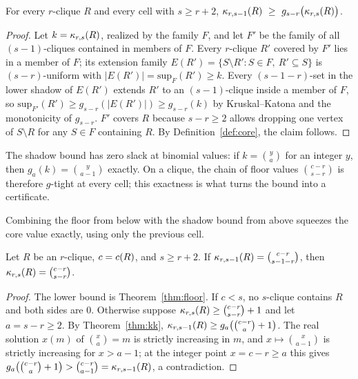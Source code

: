 \begin{theorem}
\label{thm:kk}
For every $r$-clique $R$ and every cell with $s\ge r+2$,
$\corev{r,s-1}(R)\ \ge\ g_{s-r}\big(\corev{r,s}(R)\big)$.
\end{theorem}
\begin{proof}
Let $k=\kappa_{r,s}(R)$, realized by the family $F$, and let $F'$ be the family of all $(s{-}1)$-cliques contained in members of $F$.
%
Every $r$-clique $R'$ covered by $F'$ lies in a member of $F$; its extension family $E(R')=\{S\setminus R' : S\in F,\ R'\subseteq S\}$ is $(s{-}r)$-uniform with $|E(R')|=\mathrm{sup}_F(R')\ge k$.
%
Every $(s{-}1{-}r)$-set in the lower shadow of $E(R')$ extends $R'$ to an $(s{-}1)$-clique inside a member of $F$, so $\mathrm{sup}_{F'}(R')\ge g_{s-r}(|E(R')|)\ge g_{s-r}(k)$ by Kruskal--Katona and the monotonicity of $g_{s-r}$.
%
$F'$ covers $R$ because $s-r\ge 2$ allows dropping one vertex of $S\setminus R$ for any $S\in F$ containing $R$.
%
By Definition~\ref{def:core}, the claim follows.
\end{proof}

\begin{remark}
The shadow bound has zero slack at binomial values: if $k=\binom{y}{a}$ for an integer $y$, then $g_a(k)=\binom{y}{a-1}$ exactly.
%
On a clique, the chain of floor values $\binom{c-r}{s-r}$ is therefore $g$-tight at every cell; this exactness is what turns the bound into a certificate.
\end{remark}

Combining the floor from below with the shadow bound from above squeezes the core value exactly, using only the previous cell.

\begin{theorem}
\label{thm:chain}
Let $R$ be an $r$-clique, $c=c(R)$, and $s\ge r+2$.
%
If $\kappa_{r,s-1}(R)=\binom{c-r}{s-1-r}$, then $\kappa_{r,s}(R)=\binom{c-r}{s-r}$.
\end{theorem}
\begin{proof}
The lower bound is Theorem~\ref{thm:floor}.
%
If $c<s$, no $s$-clique contains $R$ and both sides are $0$.
%
Otherwise suppose $\kappa_{r,s}(R)\ge\binom{c-r}{s-r}+1$ and let $a=s-r\ge 2$.
%
By Theorem~\ref{thm:kk}, $\kappa_{r,s-1}(R)\ge g_a\big(\binom{c-r}{a}+1\big)$.
%
The real solution $x(m)$ of $\binom{x}{a}=m$ is strictly increasing in $m$, and $x\mapsto\binom{x}{a-1}$ is strictly increasing for $x>a-1$; at the integer point $x=c-r\ge a$ this gives $g_a\big(\binom{c-r}{a}+1\big)>\binom{c-r}{a-1}=\kappa_{r,s-1}(R)$, a contradiction.
\end{proof}

